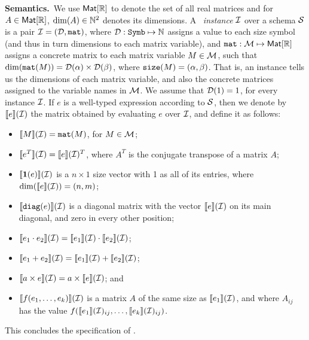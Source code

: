 \smallskip
\noindent
\textbf{Semantics.}\, We use $\textsf{Mat}[\mathbb{R}]$ to denote the set of all real matrices and for 
$A\in\textsf{Mat}[\mathbb{R}]$, $\dim(A)\in\mathbb{N}^2$ denotes its dimensions.
A \lang\ \textit{instance} $\mathcal{I}$ over a schema $\mathcal{S}$ is a pair $\mathcal{I} = (\mathcal{D},\texttt{mat})$, where $\mathcal{D} : \texttt{Symb} \mapsto \mathbb{N}$ assigns a value to each size symbol (and thus in turn  dimensions to each matrix variable), and $\texttt{mat} : \mathcal{M} \mapsto \textsf{Mat}[\mathbb{R}]$ assigns a concrete matrix to each matrix variable $M\in \mathcal{M}$, such that $\dim(\texttt{mat}(M)) = \mathcal{D}(\alpha)\times \mathcal{D}(\beta)$, where $\texttt{size}(M) = (\alpha,\beta)$. That is, an instance tells us the dimensions of each matrix variable, and also the concrete matrices assigned to the variable names in $\mathcal{M}$. We assume that $\mathcal{D}(1) = 1$, for every instance $\mathcal{I}$. If $e$ is a well-typed expression according to $\mathcal{S}$, then we denote by $\llbracket e \rrbracket(\mathcal{I})$ the matrix obtained by evaluating $e$ over $\mathcal{I}$, and define it as follows:
\begin{itemize}
\item $\llbracket M \rrbracket(\mathcal{I}) = \texttt{mat}(M)$, for $M\in \mathcal{M}$;
\item $\llbracket e^T \rrbracket(\mathcal{I}) = \llbracket e \rrbracket(\mathcal{I})^T$, where $A^T$ is the conjugate transpose of a matrix $A$;
\item $\llbracket \mathbf{1}(e) \rrbracket(\mathcal{I})$ is a $n\times 1$ size vector with 1 as all of its entries, where $\dim(\llbracket e \rrbracket(\mathcal{I}))=(n,m)$;
\item $\llbracket \texttt{diag}(e) \rrbracket(\mathcal{I})$ is a diagonal matrix with the vector $\llbracket e \rrbracket(\mathcal{I})$ on its main diagonal, and zero in every other position;
\item $\llbracket e_1\cdot e_2 \rrbracket(\mathcal{I}) = \llbracket e_1 \rrbracket(\mathcal{I}) \cdot \llbracket e_2 \rrbracket(\mathcal{I})$;
\item $\llbracket e_1+ e_2 \rrbracket(\mathcal{I}) = \llbracket e_1 \rrbracket(\mathcal{I}) + \llbracket e_2 \rrbracket(\mathcal{I})$;
\item $\llbracket a\times e \rrbracket(\mathcal{I}) = a\times \llbracket e \rrbracket(\mathcal{I})$; and
\item $\llbracket f(e_1,\ldots ,e_k) \rrbracket(\mathcal{I})$ is a matrix $A$ of the same size as $\llbracket e_1 \rrbracket(\mathcal{I})$, and where $A_{ij}$ has the value $f(\llbracket e_1 \rrbracket(\mathcal{I})_{ij},\ldots ,\llbracket e_k \rrbracket(\mathcal{I})_{ij})$.
\end{itemize}
This concludes the specification of \lang. 

